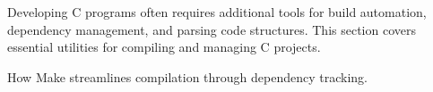 \begin{NxSSBox}
	\begin{NxIDBox}
		Developing C programs often requires additional tools for build automation, dependency management, and parsing code structures. This section covers essential utilities for compiling and managing C projects.
	\end{NxIDBox}
	\begin{NxIDBoxL}
		 How Make streamlines compilation through dependency tracking.
	\end{NxIDBoxL}
\end{NxSSBox}



%
%
%
%

